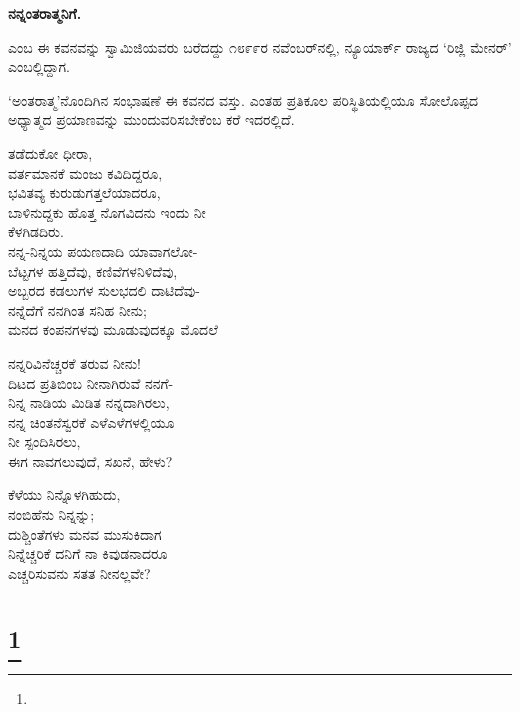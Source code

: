 \begin{center}
\textbf{ನನ್ನಂತರಾತ್ಮನಿಗೆ.}
\end{center}

 ಎಂಬ ಈ ಕವನವನ್ನು ಸ್ವಾಮಿಜಿಯವರು ಬರೆದದ್ದು ೧೮೯೯ರ ನವೆಂಬರ್‌ನಲ್ಲಿ, ನ್ಯೂಯಾರ್ಕ್ ರಾಜ್ಯದ ‘ರಿಜ್ಲಿ ಮೇನರ್’ ಎಂಬಲ್ಲಿದ್ದಾಗ.

‘ಅಂತರಾತ್ಮ’ನೊಂದಿಗಿನ ಸಂಭಾಷಣೆ ಈ ಕವನದ ವಸ್ತು. ಎಂತಹ ಪ್ರತಿಕೂಲ ಪರಿಸ್ಥಿತಿಯಲ್ಲಿಯೂ ಸೋಲೊಪ್ಪದ ಅಧ್ಯಾತ್ಮದ ಪ್ರಯಾಣವನ್ನು ಮುಂದುವರಿಸಬೇಕೆಂಬ ಕರೆ ಇದರಲ್ಲಿದೆ.

\begin{myquote}
ತಡೆದುಕೋ ಧೀರಾ,\\ವರ್ತಮಾನಕೆ ಮಂಜು ಕವಿದಿದ್ದರೂ,\\ಭವಿತವ್ಯ ಕುರುಡುಗತ್ತಲೆಯಾದರೂ,\\ಬಾಳಿನುದ್ದಕು ಹೊತ್ತ ನೊಗವಿದನು ಇಂದು ನೀ\\ಕೆಳಗಿಡದಿರು.\\ನನ್ನ-ನಿನ್ನಯ ಪಯಣದಾದಿ ಯಾವಾಗಲೋ-\\ಬೆಟ್ಟಗಳ ಹತ್ತಿದೆವು, ಕಣಿವೆಗಳನಿಳಿದೆವು,\\ಅಬ್ಬರದ ಕಡಲುಗಳ ಸುಲಭದಲಿ ದಾಟಿದೆವು-\\ನನ್ನೆದೆಗೆ ನನಗಿಂತ ಸನಿಹ ನೀನು;\\ಮನದ ಕಂಪನಗಳವು ಮೂಡುವುದಕ್ಕೂ ಮೊದಲೆ
\end{myquote}

\begin{myquote}
ನನ್ನರಿವಿನೆಚ್ಚರಕೆ ತರುವ ನೀನು!\\ದಿಟದ ಪ್ರತಿಬಿಂಬ ನೀನಾಗಿರುವೆ ನನಗೆ-\\ನಿನ್ನ ನಾಡಿಯ ಮಿಡಿತ ನನ್ನದಾಗಿರಲು,\\ನನ್ನ ಚಿಂತನೆಸ್ವರಕೆ ಎಳೆಎಳೆಗಳಲ್ಲಿಯೂ\\ನೀ ಸ್ಪಂದಿಸಿರಲು,\\ಈಗ ನಾವಗಲುವುದೆ, ಸಖನೆ, ಹೇಳು?
\end{myquote}

\begin{myquote}
ಕೆಳೆಯು ನಿನ್ನೊಳಗಿಹುದು,\\ನಂಬಿಹೆನು ನಿನ್ನನ್ನು;\\ದುಶ್ಚಿಂತೆಗಳು ಮನವ ಮುಸುಕಿದಾಗ\\ನಿನ್ನೆಚ್ಚರಿಕೆ ದನಿಗೆ ನಾ ಕಿವುಡನಾದರೂ\\ಎಚ್ಚರಿಸುವನು ಸತತ ನೀನಲ್ಲವೇ?
\end{myquote}

\selecteng

\chapter[NO ONE TO BLAME]{\protect\footnote{}}

